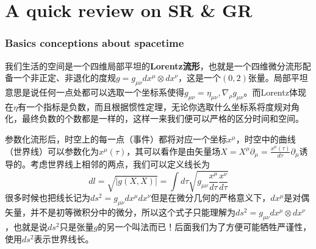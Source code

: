 \part{A quick review on SR \& GR}
\section{Basics conceptions about spacetime}\label{sec:1}
我们生活的空间是一个四维局部平坦的\textbf{Lorentz流形}，也就是一个四维微分流形配备一个非正定、非退化的度规$g=g_{\mu\nu}dx^\mu\otimes dx^\nu$，这是一个$(0,2)$张量。局部平坦意思是说任何一点处都可以选取一个坐标系使得$g_{\mu\nu}=\eta_{\mu\nu},\nabla_\rho g_{\mu\nu}$。而Lorentz体现在$\eta$有一个指标是负数，而且根据惯性定理，无论你选取什么坐标系将度规对角化，最终负数的个数都是一样的，这样一来我们便可以严格的区分时间和空间。

参数化流形后，时空上的每一点（事件）都将对应一个坐标$x^\mu$，时空中的曲线（世界线）可以参数化为$x^\mu(\tau)$，其可以看作是由矢量场$X=X^\mu\partial_\mu=\frac{x^\mu(\tau)}{d\tau}\partial_\mu$诱导的。考虑世界线上相邻的两点，我们可以定义线长为
\[dl=\sqrt{|g(X,X)|}=\int d\tau\sqrt{g_{\mu\nu}\frac{x^\mu}{d\tau}\frac{x^\nu}{d\tau}}\]
很多时候也把线长记为$ds^2=g_{\mu\nu}dx^\mu dx^\nu$但是在微分几何的严格意义下，$dx^\mu$是对偶矢量，并不是初等微积分中的微分，所以这个式子只能理解为$ds^2=g_{\mu\nu}dx^\mu\otimes dx^\nu$，也就是说$ds^2$只是张量$g$的另一个叫法而已！后面我们为了方便可能牺牲严谨性，使用$ds^2$表示世界线长。

